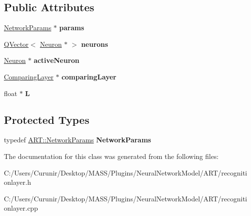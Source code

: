 \subsection*{Public Attributes}
\begin{DoxyCompactItemize}
\item 
\mbox{\label{class_recognition_layer_ad7c8360d3fd4e0b226ebdd59009e0107}} 
\hyperlink{struct_a_r_t_1_1_network_params}{Network\+Params} $\ast$ {\bfseries params}
\item 
\mbox{\label{class_recognition_layer_a3c49cae5408fe8a168e10d4fa55cfddc}} 
\hyperlink{class_q_vector}{Q\+Vector}$<$ \hyperlink{class_neuron}{Neuron} $\ast$ $>$ {\bfseries neurons}
\item 
\mbox{\label{class_recognition_layer_a3447fe282012e286d3f3679e496608a2}} 
\hyperlink{class_neuron}{Neuron} $\ast$ {\bfseries active\+Neuron}
\item 
\mbox{\label{class_recognition_layer_ac09eaecc3fb12d0b4a78ba4afb7e3d29}} 
\hyperlink{class_comparing_layer}{Comparing\+Layer} $\ast$ {\bfseries comparing\+Layer}
\item 
\mbox{\label{class_recognition_layer_a0b307b594c9487964fff6b88c7b951c2}} 
float $\ast$ {\bfseries L}
\end{DoxyCompactItemize}
\subsection*{Protected Types}
\begin{DoxyCompactItemize}
\item 
\mbox{\label{class_recognition_layer_acde635417a1da14a2dba1ec04542341b}} 
typedef \hyperlink{struct_a_r_t_1_1_network_params}{A\+R\+T\+::\+Network\+Params} {\bfseries Network\+Params}
\end{DoxyCompactItemize}


The documentation for this class was generated from the following files\+:\begin{DoxyCompactItemize}
\item 
C\+:/\+Users/\+Curunir/\+Desktop/\+M\+A\+S\+S/\+Plugins/\+Neural\+Network\+Model/\+A\+R\+T/recognitionlayer.\+h\item 
C\+:/\+Users/\+Curunir/\+Desktop/\+M\+A\+S\+S/\+Plugins/\+Neural\+Network\+Model/\+A\+R\+T/recognitionlayer.\+cpp\end{DoxyCompactItemize}
